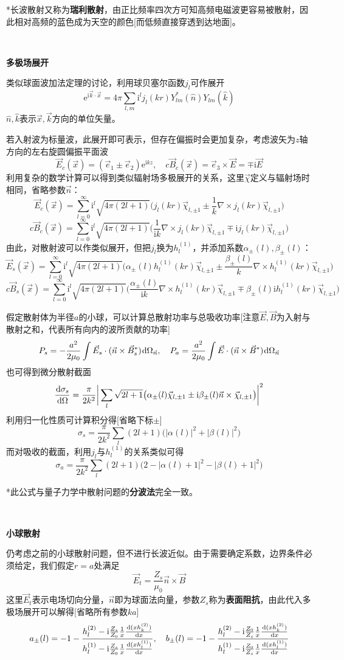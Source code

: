 \documentclass[a4paper,UTF8,fontset=windows]{ctexart}
\newcommand*{\dr}{\hspace{0.07em}\mathrm{d}}
\newcommand*{\er}{\mathrm{e}}
\newcommand*{\ir}{\mathrm{i}}
\newcommand*{\vb}{\vec{B}}
\newcommand*{\ve}{\vec{E}}
\newcommand*{\ves}{\vec{e}}
\newcommand*{\vks}{\vec{k}}
\newcommand*{\vns}{\vec{n}}
\newcommand*{\vx}{\vec{x}}
\newcommand*{\vchi}{\vec{\chi}}
\newcommand*{\dt}[2][t]{\frac{\dr #2}{\dr #1}}
\begin{document}
*长波散射又称为\textbf{瑞利散射}，由正比频率四次方可知高频电磁波更容易被散射，因此相对高频的蓝色成为天空的颜色[而低频直接穿透到达地面]。

\

\textbf{多极场展开}

类似球面波加法定理的讨论，利用球贝塞尔函数$j_l$可作展开
$$\er^{\ir\vks\cdot\vx}=4\pi\sum_{l,m}\ir^lj_l(kr)Y_{lm}^*(\hat{n})Y_{lm}(\hat{k})$$
$\hat{n},\hat{k}$表示$\vx,\vks$方向的单位矢量。

若入射波为标量波，此展开即可表示，但存在偏振时会更加复杂，考虑波矢为$z$轴方向的左右旋圆偏振平面波
$$\ve_c(\vx)=(\ves_1\pm\ves_2)\er^{\ir kz},\quad c\vb_c(\vx)=\ves_3\times\ve=\mp\ir\ve$$
利用复杂的数学计算可以得到类似辐射场多极展开的关系，这里$\vchi$定义与辐射场时相同，省略参数$\vns$：
$$\ve_c(\vx)=\sum_{l=0}^\infty\ir^l\sqrt{4\pi(2l+1)}\bigg(j_l(kr)\vchi_{l,\pm1}\pm\frac{1}{k}\nabla\times j_l(kr)\vchi_{l,\pm1}\bigg)$$
$$c\vb_c(\vx)=\sum_{l=0}^\infty\ir^l\sqrt{4\pi(2l+1)}\bigg(\frac{1}{\ir k}\nabla\times j_l(kr)\vchi_{l,\pm1}\mp\ir j_l(kr)\vchi_{l,\pm1}\bigg)$$
由此，对散射波可以作类似展开，但把$j_l$换为$h_l^{(1)}$，并添加系数$\alpha_\pm(l),\beta_\pm(l)$：
$$\ve_s(\vx)=\sum_{l=0}^\infty\ir^l\sqrt{4\pi(2l+1)}\bigg(\alpha_\pm(l)h_l^{(1)}(kr)\vchi_{l,\pm1}\pm\frac{\beta_\pm(l)}{k}\nabla\times h_l^{(1)}(kr)\vchi_{l,\pm1}\bigg)$$
$$c\vb_s(\vx)=\sum_{l=0}^\infty\ir^l\sqrt{4\pi(2l+1)}\bigg(\frac{\alpha_\pm(l)}{\ir k}\nabla\times h_l^{(1)}(kr)\vchi_{l,\pm1}\mp\beta_\pm(l)\ir h_l^{(1)}(kr)\vchi_{l,\pm1}\bigg)$$

假定散射体为半径$a$的小球，可以计算总散射功率与总吸收功率[注意$\ve,\vb$为入射与散射之和，代表所有向内的波所贡献的功率]
$$P_s=-\frac{a^2}{2\mu_0}\int\ve_s\cdot(\vns\times\vb_s^*)\dr\Omega_{\vns},\quad P_a=\frac{a^2}{2\mu_0}\int\ve\cdot(\vns\times\vb^*)\dr\Omega_{\vns}$$
也可得到微分散射截面
$$\dt[\Omega]{\sigma_s}=\frac{\pi}{2k^2}\bigg|\sum_l\sqrt{2l+1}\big(\alpha_\pm(l)\vchi_{l,\pm1}\pm\ir\beta_\pm(l)\vns\times\vchi_{l,\pm1}\big)\bigg|^2$$
利用归一化性质可计算积分得[省略下标$\pm$]
$$\sigma_s=\frac{\pi}{2k^2}\sum_l(2l+1)\big(|\alpha(l)|^2+|\beta(l)|^2\big)$$
而对吸收的截面，利用$j_l$与$h_l^{(1)}$的关系类似可得
$$\sigma_a=\frac{\pi}{2k^2}\sum_l(2l+1)\big(2-|\alpha(l)+1|^2-|\beta(l)+1|^2\big)$$

*此公式与量子力学中散射问题的\textbf{分波法}完全一致。

\

\textbf{小球散射}

仍考虑之前的小球散射问题，但不进行长波近似。由于需要确定系数，边界条件必须给定，我们假定$r=a$处满足
$$\ve_t=\frac{Z_s}{\mu_0}\vns\times\vb$$
这里$\ve_t$表示电场切向分量，$\vns$即为球面法向量，参数$Z_s$称为\textbf{表面阻抗}，由此代入多极场展开可以解得[省略所有参数$ka$]
$$a_\pm(l)=-1-\frac{h_l^{(2)}-\ir\frac{Z_s}{Z_0}\frac{1}{x}\dt[x]{(xh_k^{(2)})}}{h_l^{(1)}-\ir\frac{Z_s}{Z_0}\frac{1}{x}\dt[x]{(xh_l^{(1)})}},\quad b_\pm(l)=-1-\frac{h_l^{(2)}-\ir\frac{Z_0}{Z_s}\frac{1}{x}\dt[x]{(xh_k^{(2)})}}{h_l^{(1)}-\ir\frac{Z_0}{Z_s}\frac{1}{x}\dt[x]{(xh_l^{(1)})}}$$
\end{document}
